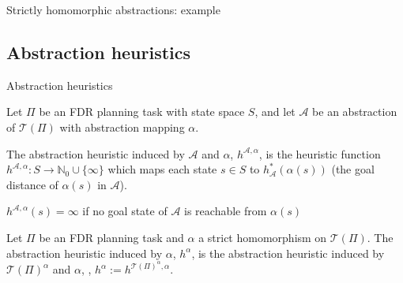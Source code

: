 \documentclass{gkibeamer}
\begin{document}
\begin{frame}{Strictly homomorphic abstractions: example}
  \begin{center}
  \end{center}


\end{frame}

\subsection{Abstraction heuristics}

\begin{frame}{Abstraction heuristics}
  \begin{definition}
    Let $\Pi$ be an FDR planning task with state space $S$, and let
    $\mathcal A$ be an abstraction of $\mathcal T(\Pi)$ with
    abstraction mapping $\alpha$.

    \smallskip

    The \alert{abstraction heuristic induced by $\mathcal A$ and
      $\alpha$}, \alert{$h^{\mathcal A, \alpha}$}, is the heuristic
    function $h^{\mathcal A, \alpha}: S \to \mathbb N_0 \cup
    \{\infty\}$ which maps each state $s \in S$ to
    $h^*_{\mathcal A}(\alpha(s))$ (the goal distance of $\alpha(s)$ in
    $\mathcal A$).
  \end{definition}
   $h^{\mathcal A, \alpha}(s) = \infty$ if no goal state
  of $\mathcal A$ is reachable from $\alpha(s)$

  \begin{definition}
    Let $\Pi$ be an FDR planning task and $\alpha$ a
    strict homomorphism on $\mathcal T(\Pi)$.
    The \alert{abstraction heuristic induced by $\alpha$},
    \alert{$h^\alpha$}, is the abstraction heuristic induced by
    $\mathcal T(\Pi)^\alpha$ and $\alpha$, \ie, $h^\alpha := h^{\mathcal
      T(\Pi)^\alpha, \alpha}$.
  \end{definition}
\end{frame}
\end{document}
